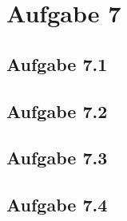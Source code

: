 \chapter{Aufgabe 7}
\section{Aufgabe 7.1}
\section{Aufgabe 7.2}
\section{Aufgabe 7.3}
\section{Aufgabe 7.4}